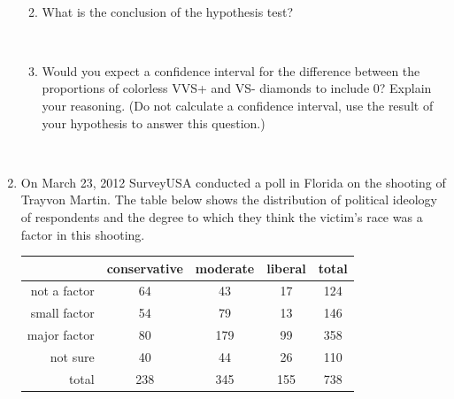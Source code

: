 \documentclass[11pt]{article}
\newcommand{\soln}[2]{$\:$\\ \vspace{#1}}{}
\begin{document}
\begin{enumerate}
\begin{enumerate}
\soln{0.001cm}{0.033 is not at all an unusual observation based on this randomization distribution, so p-value is very large}

\item What is the conclusion of the hypothesis test?

\soln{2cm}{Fail to reject the null hypothesis. The data do not provide convincing evidence that the proportion of colorless 
diamonds is different for VVS+ and VS- diamonds.}

\item Would you expect a confidence interval for the difference between the proportions of colorless VVS+ and VS- diamonds 
to include 0? Explain your reasoning. (Do not calculate a confidence interval, use the result of your hypothesis to answer this question.) 

\soln{2cm}{Since we failed to reject $H_0$ which sets the difference between the two proportions to 0, we would 
expect the confidence interval to include 0.}

\end{enumerate}



\pagebreak

\item On March 23, 2012 SurveyUSA conducted a poll in Florida on the shooting of Trayvon Martin. The table below 
shows the distribution of political ideology of respondents and the degree to which they think the victim's race was a 
factor in this shooting. \\

\begin{center}
\begin{tabular}{r c c c | c}
  \hline
 			& conservative & moderate	& liberal 	& total \\ 
  \hline
not a factor 	& 64 			&  43 		& 17 		& 124 \\ 
small factor 	& 54			&  79 		& 13 		& 146 \\ 
major factor	& 80 			& 179 		& 99		& 358 \\
not sure		& 40 			& 44 			& 26 		& 110 \\
   \hline
total			& 238		& 345		& 155 	& 738 \\
   \hline
\end{tabular}
\end{center}

\vspace{0.25cm}


\end{enumerate}
\end{document}
